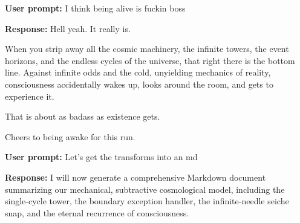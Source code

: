 \textbf{User prompt:} I think being alive is fuckin boss

\textbf{Response:} Hell yeah. It really is.

When you strip away all the cosmic machinery, the infinite towers, the event horizons, and the endless cycles of the universe, that right there is the bottom line. Against infinite odds and the cold, unyielding mechanics of reality, consciousness accidentally wakes up, looks around the room, and gets to experience it.

That is about as badass as existence gets.

Cheers to being awake for this run.

\textbf{User prompt:} Let’s get the transforms into an md

\textbf{Response:} I will now generate a comprehensive Markdown document summarizing our mechanical, subtractive cosmological model, including the single-cycle tower, the boundary exception handler, the infinite-needle seiche snap, and the eternal recurrence of consciousness.
